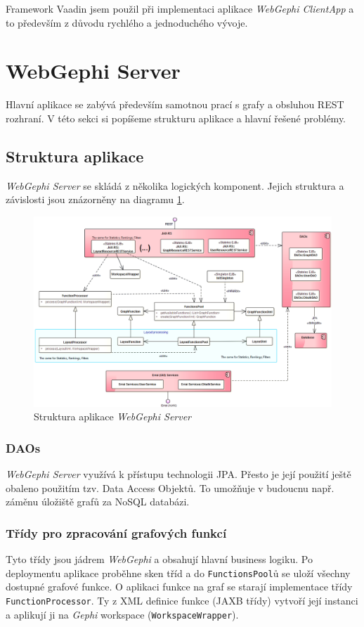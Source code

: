 \documentclass[thesis=M,czech]{FITthesis}[2014/05/6]
\begin{document}
Framework Vaadin jsem použil při implementaci aplikace \textit{WebGephi ClientApp} a to především z důvodu rychlého a jednoduchého vývoje.

\section{WebGephi Server}
Hlavní aplikace se zabývá především samotnou prací s grafy a obsluhou REST
rozhraní. V této sekci si popíšeme strukturu aplikace a hlavní řešené problémy.

\subsection{Struktura aplikace}
\textit{WebGephi Server} se skládá z několika logických komponent. Jejich struktura a závislosti jsou znázorněny na diagramu \ref{fig:webgephi-server-impl}.

\begin{figure}\centering
 	\includegraphics[width=1\textwidth]{images/diagram/webgephi-server-impl}
 	\caption[Struktura aplikace \textit{WebGephi Server}]{Struktura aplikace \textit{WebGephi Server}}\label{fig:webgephi-server-impl}
\end{figure}

\subsubsection{DAOs}
\textit{WebGephi Server} využívá k přístupu technologii JPA. Přesto je její použití ještě obaleno použitím tzv. Data Access Objektů.
To umožňuje v budoucnu např. záměnu úložiště grafů za NoSQL databázi.

\subsubsection{Třídy pro zpracování grafových funkcí}
Tyto třídy jsou jádrem \textit{WebGephi} a obsahují hlavní business logiku. Po deploymentu aplikace proběhne sken tříd a do \texttt{FunctionsPool}ů se uloží všechny dostupné 
grafové funkce. O aplikaci funkce na graf se starají implementace třídy \texttt{FunctionProcessor}. Ty z XML definice funkce (JAXB třídy) vytvoří její instanci a aplikují
ji na \textit{Gephi} workspace (\texttt{WorkspaceWrapper}).
\end{document}
